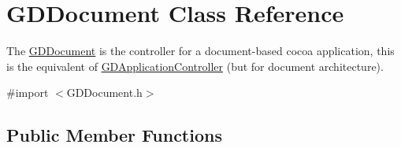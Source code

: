 \hypertarget{interface_g_d_document}{
\section{GDDocument Class Reference}
\label{interface_g_d_document}
}


The \hyperlink{interface_g_d_document}{GDDocument} is the controller for a document-\/based cocoa application, this is the equivalent of \hyperlink{interface_g_d_application_controller}{GDApplicationController} (but for document architecture).  


{\ttfamily \#import $<$GDDocument.h$>$}\subsection*{Public Member Functions}
